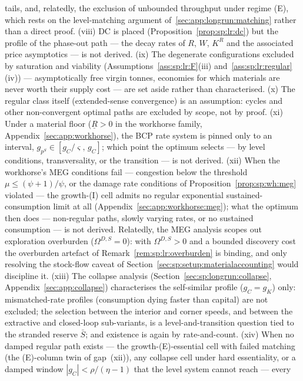 tails, and, relatedly, the exclusion of unbounded throughput under regime (E), which rests on
the level-matching argument of~\ref{sec:app:longrun:matching} rather than a direct proof. (viii) DC is placed (Proposition~\ref{prop:sp:lr:dc}) but the profile of the phase-out
path --- the decay rates of $R$, $W$, $K^R$ and the associated price asymptotics --- is not
derived. (ix) The degenerate configurations excluded by saturation and viability
(Assumptions~\ref{ass:sp:lr:F}(iii) and~\ref{ass:sp:lr:regular}(iv)) --- asymptotically free
virgin tonnes, economies for which materials are never worth their supply cost --- are set
aside rather than characterised. (x) The regular class itself (extended-sense convergence) is
an assumption: cycles and other non-convergent optimal paths are excluded by scope, not by
proof. (xi) Under a material floor ($\underline R>0$ in the workhorse family,
Appendix~\ref{sec:app:workhorse}), the BCP rate system is pinned only to an interval,
$g_{p^S}\in\left[g_C/\varsigma,\,g_C\right]$; which point the optimum selects --- by level
conditions, transversality, or the transition --- is not derived. (xii) When the workhorse's
MEG conditions fail --- congestion below the threshold $\mu\le\left(\psi+1\right)/\psi$, or
the damage rate conditions of Proposition~\ref{prop:sp:wh:meg} violated --- the growth-(I)
cell admits no regular exponential sustained-consumption limit at all
(Appendix~\ref{sec:app:workhorse:meg}); what the optimum then does --- non-regular paths,
slowly varying rates, or no sustained consumption --- is not derived. Relatedly, the MEG
analysis scopes out exploration overburden ($\Omega^{D,S}=0$): with $\Omega^{D,S}>0$ and a
bounded discovery cost the overburden artefact of Remark~\ref{rem:sp:lr:overburden} is
binding, and only resolving the stock-flow caveat of
Section~\ref{sec:sp:setup:materialaccounting} would discipline it.
(xiii) The collapse analysis (Section~\ref{sec:sp:longrun:collapse},
Appendix~\ref{sec:app:collapse}) characterises the self-similar profile ($g_C=g_K$) only:
mismatched-rate profiles (consumption dying faster than capital) are not excluded; the
selection between the interior and corner speeds, and between the extractive and closed-loop
sub-variants, is a level-and-transition question tied to the stranded reserve $\bar S$; and
existence is again by rate-and-count. (xiv) When no damped regular path exists --- the
growth-(E)-essential cell with failed matching (the (E)-column twin of gap~(xii)), any
collapse cell under hard essentiality, or a damped window
$\left|g_C\right|<\rho/\left(\eta-1\right)$ that the level system cannot reach --- every
